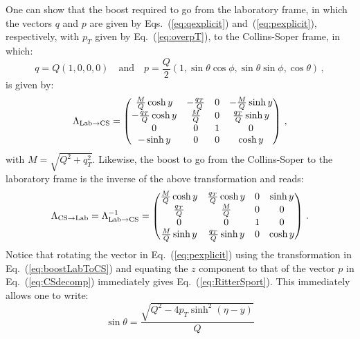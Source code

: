 \documentclass[10pt,a4paper]{article}
\begin{document}
One can show that the boost required to go from the laboratory frame,
in which the vectors $q$ and $p$ are given by
Eqs.~(\ref{eq:qexplicit}) and~(\ref{eq:pexplicit}), respectively, with
$p_T$ given by Eq.~(\ref{eq:overpT}), to the Collins-Soper frame, in
which:
\begin{equation}\label{eq:CSdecomp}
q = Q(1,0,0,0)\quad\mbox{and}\quad p = \frac{Q}2(1,\sin\theta\cos\phi, \sin\theta\sin\phi,\cos\theta)\,,
\end{equation}
is given by:
\begin{equation}\label{eq:boostLabToCS}
\Lambda_{{\rm Lab}\rightarrow {\rm CS}} = 
\begin{pmatrix}
\frac{M}{Q}\cosh y & -\frac{q_T}{Q} & 0 & -\frac{M}{Q}\sinh y\\
-\frac{q_T}{Q}\cosh y & \frac{M}{Q} & 0 & \frac{q_T}{Q}\sinh y\\
0 & 0 & 1 & 0 \\
-\sinh y & 0 & 0 & \cosh y
\end{pmatrix}\,,
\end{equation}
with $M=\sqrt{Q^2+q_T^2}$. Likewise, the boost to go from the
Collins-Soper to the laboratory frame is the inverse of the above
transformation and reads:
\begin{equation}\label{eq:boostCSToLab}
\Lambda_{ {\rm CS}\rightarrow{\rm Lab}} = \Lambda_{{\rm Lab}\rightarrow {\rm CS}}^{-1}=
\begin{pmatrix}
\frac{M}{Q}\cosh y & \frac{q_T}{Q}\cosh y & 0 & \sinh y\\
\frac{q_T}{Q} & \frac{M}{Q} & 0 & 0\\
0 & 0 & 1 & 0 \\
\frac{M}{Q}\sinh y & \frac{q_T}{Q}\sinh y & 0 & \cosh y
\end{pmatrix}\,.
\end{equation}
Notice that rotating the vector in Eq.~(\ref{eq:pexplicit}) using the
transformation in Eq.~(\ref{eq:boostLabToCS}) and equating the $z$
component to that of the vector $p$ in Eq.~(\ref{eq:CSdecomp})
immediately gives Eq.~(\ref{eq:RitterSport}). This immediately allows
one to write:
\begin{equation}
\sin\theta = \frac{\sqrt{Q^2-4p_T\sinh^2(\eta-y)}}{Q}
\end{equation}

\newpage


\end{document}
